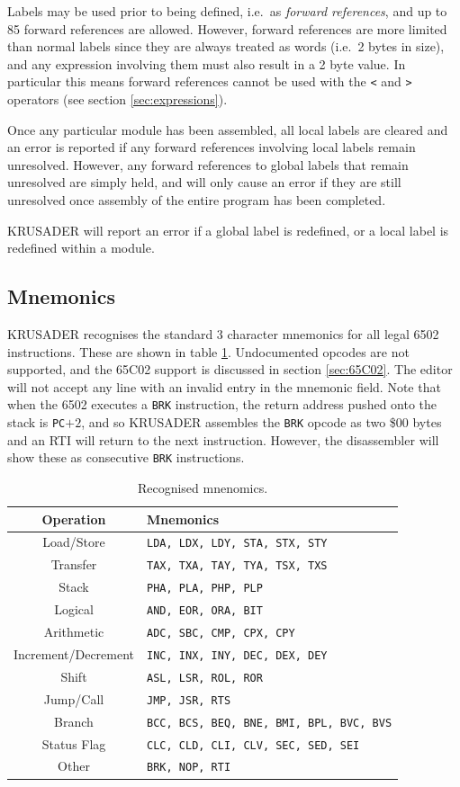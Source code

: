 \documentclass[12pt]{article}
\newcommand{\krusader}{\textsf{KRUSADER}\xspace}
\begin{document}
Labels may be used prior to being defined, i.e.~as \textit{forward references}, and up to 85 forward references are allowed. However, forward references are more limited than normal
labels since they are always treated as words (i.e.~2 bytes in size), and any expression
involving them must also result in a 2 byte value. 
In particular this means forward references cannot be used with the \texttt{<} and \texttt{>} operators (see section \ref{sec:expressions}).

Once any particular module has been assembled, 
all local labels are cleared and an error is reported if any forward references
involving local labels remain unresolved.  However, any forward references 
to global labels that remain unresolved are simply held, and will only cause
an error if they are still unresolved once assembly of the entire program 
has been completed.

\krusader will report an error if a global label is redefined, or a local label is redefined within a module.

\subsection{Mnemonics}
\label{sec:mnemonics}

\krusader recognises the standard 3 character mnemonics for all legal 6502 instructions.  These are shown in table \ref{tab:mnemonics}.  Undocumented opcodes are not supported, and the 65C02 support is discussed in section \ref{sec:65C02}.
The editor will not accept any line with an invalid entry in the mnemonic field.
Note that when the 6502 executes a \texttt{BRK} instruction, the return address pushed
onto the stack is \texttt{PC}$+2$, and so \krusader assembles the \texttt{BRK} opcode as two \$00 bytes
and an RTI will return to the next instruction. However, the disassembler will show these as consecutive \texttt{BRK} instructions.
\begin{table}[htb]
	\centering
	\begin{tabular}{|c|l|} \hline
	\textbf{Operation} & \textbf{Mnemonics} \tabularnewline
	\hline
	Load/Store & \texttt{LDA, LDX, LDY, STA, STX, STY} \tabularnewline\hline
	Transfer & \texttt{TAX, TXA, TAY, TYA, TSX, TXS} \tabularnewline\hline
	Stack & \texttt{PHA, PLA, PHP, PLP} \tabularnewline\hline
	Logical & \texttt{AND, EOR, ORA, BIT} \tabularnewline\hline
	Arithmetic & \texttt{ADC, SBC, CMP, CPX, CPY} \tabularnewline\hline
	Increment/Decrement & \texttt{INC, INX, INY, DEC, DEX, DEY} \tabularnewline\hline
	Shift & \texttt{ASL, LSR, ROL, ROR} \tabularnewline\hline
	Jump/Call & \texttt{JMP, JSR, RTS} \tabularnewline\hline
	Branch & \texttt{BCC, BCS, BEQ, BNE, BMI, BPL, BVC, BVS} \tabularnewline\hline
	Status Flag & \texttt{CLC, CLD, CLI, CLV, SEC, SED, SEI} \tabularnewline\hline
	Other & \texttt{BRK, NOP, RTI} \tabularnewline
	\hline
	\end{tabular}
	\caption{Recognised mnenomics.}
	\label{tab:mnemonics}
\end{table}
\end{document}
